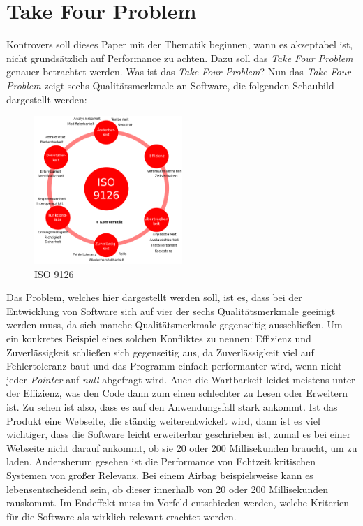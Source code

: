 \section{Take Four Problem}
	Kontrovers soll dieses Paper mit der Thematik beginnen, wann es akzeptabel ist, nicht grundsätzlich auf Performance zu achten. Dazu soll das \emph{Take Four Problem} genauer betrachtet werden. Was ist das \emph{Take Four Problem}? Nun das \emph{Take Four Problem} zeigt sechs Qualitätsmerkmale an Software, die folgenden Schaubild dargestellt werden:
	
	\begin{figure}[h]
    \centering
    \includegraphics[width=0.5\textwidth]{bilder/ISO}
    \caption[ISO 9126]{ISO 9126 \cite{ISOIEC}}
     \label{img:iso}
 \end{figure}
 
Das Problem, welches hier dargestellt werden soll, ist es, dass bei der Entwicklung von Software sich auf vier der sechs Qualitätsmerkmale geeinigt werden muss, da sich manche Qualitätsmerkmale gegenseitig ausschließen. Um ein konkretes Beispiel eines solchen Konfliktes zu nennen: Effizienz und Zuverlässigkeit schließen sich gegenseitig aus, da Zuverlässigkeit viel auf Fehlertoleranz baut und das Programm einfach performanter wird, wenn nicht jeder \emph{Pointer} auf \emph{null} abgefragt wird. Auch die Wartbarkeit leidet meistens unter der Effizienz, was den Code dann zum einen schlechter zu Lesen oder Erweitern ist.
\newline
\newline
Zu sehen ist also, dass es auf den Anwendungsfall stark ankommt. Ist das Produkt eine Webseite, die ständig weiterentwickelt wird, dann ist es viel wichtiger, dass die Software leicht erweiterbar geschrieben ist, zumal es bei einer Webseite nicht darauf ankommt, ob sie 20 oder 200 Millisekunden braucht, um zu laden. 
\newline
\newline
Andersherum gesehen ist die Performance von Echtzeit kritischen Systemen von großer Relevanz. Bei einem Airbag beispielsweise kann es lebensentscheidend sein, ob dieser innerhalb von 20 oder 200 Millisekunden rauskommt. Im Endeffekt muss im Vorfeld entschieden werden, welche Kriterien für die Software als wirklich relevant erachtet werden.